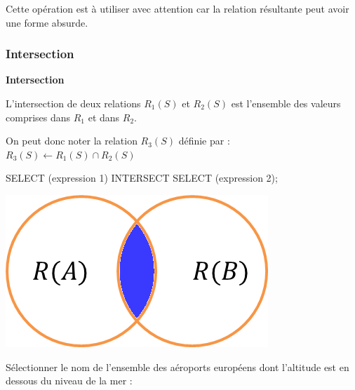 \documentclass[10pt]{article}
\newif\ifprof
\begin{document}
\begin{rem}
Cette opération est à utiliser avec attention car la relation résultante peut avoir une forme absurde.
\end{rem}

\subsubsection{Intersection}
\begin{defi}
\begin{minipage}[c]{.75\linewidth}
\textbf{Intersection}

L'intersection de deux relations $R_1(S)$ et $R_2(S)$ est l'ensemble des valeurs comprises dans $R_1$ et dans $R_2$. 

On peut donc noter la relation $R_3(S)$ définie par : $R_3(S)\leftarrow R_1(S)\cap R_2(S)$

\begin{envsql}
\begin{sql}
SELECT  (expression 1) INTERSECT SELECT (expression 2);
\end{sql}
\end{envsql}
\end{minipage}\hfill
\begin{minipage}[c]{.2\linewidth}
\begin{center}
\includegraphics[width=.95\textwidth]{images/inter}
\end{center}
\end{minipage}
\end{defi}

\begin{exemple}
Sélectionner le nom de l'ensemble des aéroports européens dont l'altitude est en dessous du niveau de la mer :
\ifprof
$$
\pi_{\text{name}}\left(\sigma_{\text{continent}=''EU''}(\text{airports}) \cap \sigma_{\text{elevation\_ft}\leq0}(\text{airports}) \right)
$$
\begin{envsql}
\begin{sql}
SELECT name FROM airports WHERE continent=''EU''
    INTERSECT SELECT name FROM airports WHERE elevation_ft<=0;
\end{sql}
\end{envsql}
\else
\vspace{4cm}
\fi

\end{exemple}
\end{document}
